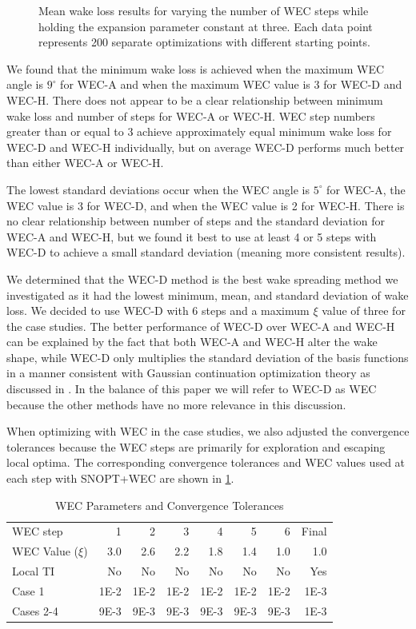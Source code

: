 \documentclass{jpconf}
\begin{document}
\begin{figure}[ht]
\begin{minipage}[t]{0.47\textwidth}
		\caption{Mean wake loss results for varying the number of WEC steps while holding the expansion parameter constant at three. Each data point represents 200 separate optimizations with different starting points.}
		\label{fig:aepmean-ws}
	\end{minipage}
\end{figure}

We found that the minimum wake loss is achieved when the maximum WEC angle is $9^\circ$ for WEC-A and when the maximum WEC value is 3 for WEC-D and WEC-H. There does not appear to be a clear relationship between minimum wake loss and number of steps for WEC-A or WEC-H. WEC step numbers greater than or equal to 3 achieve approximately equal minimum wake loss for WEC-D and WEC-H individually, but on average WEC-D performs much better than either WEC-A or WEC-H.

The lowest standard deviations occur when the WEC angle is $5^\circ$ for WEC-A, the WEC value is 3 for WEC-D, and when the WEC value is 2 for WEC-H. There is no clear relationship between number of steps and the standard deviation for WEC-A and WEC-H, but we found it best to use at least 4 or 5 steps with WEC-D to achieve a small standard deviation (meaning more consistent results).

We determined that the WEC-D method is the best wake spreading method we investigated as it had the lowest minimum, mean, and standard deviation of wake loss. We decided to use WEC-D with 6 steps and a maximum $\xi$ value of three for the case studies. The better performance of WEC-D over WEC-A and WEC-H can be explained by the fact that both WEC-A and WEC-H alter the wake shape, while WEC-D only multiplies the standard deviation of the basis functions in a manner consistent with Gaussian continuation optimization theory as discussed in \cite{mobahi2015}. In the balance of this paper we will refer to WEC-D as WEC because the other methods have no more relevance in this discussion. 

When optimizing with WEC in the case studies, we also adjusted the convergence tolerances because the WEC steps are primarily for exploration and escaping local optima. The corresponding convergence tolerances and WEC values used at each step with SNOPT+WEC are shown in \cref{tab:wectols}. 

\begin{table}[h!]
	\centering
	\caption{WEC Parameters and Convergence Tolerances}
	\label{tab:wectols}
	\begin{tabular}{lrrrrrrr}
		\toprule		
	WEC step & 1 & 2 & 3 & 4 & 5 & 6 & Final \\
	\cmidrule{2-8}
	WEC Value ($\xi$) & 3.0 & 2.6 & 2.2 & 1.8 & 1.4 & 1.0 & 1.0 \\
	Local TI & No & No & No & No & No & No & Yes \\
	Case 1 &	1E-2 & 1E-2 & 1E-2 & 1E-2 & 1E-2 & 1E-2 & 1E-3 \\
	Cases 2-4 &	9E-3 & 9E-3 & 9E-3 & 9E-3 & 9E-3 & 9E-3 & 1E-3 \\
		\bottomrule
	\end{tabular}
\end{table}
\end{document}
